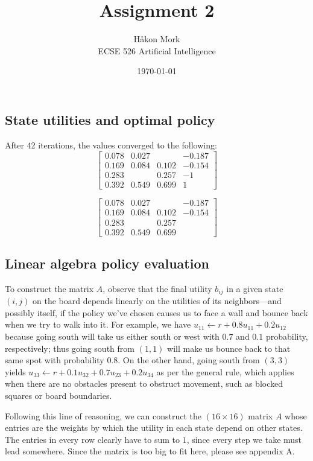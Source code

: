 \documentclass[letterpaper, 10pt]{article}
\title{\textbf{Assignment 2}}
\author{Håkon Mork \\ ECSE 526 Artificial Intelligence}
\date{\today}
\begin{document}
\maketitle
\noindent
\begin{multicols}{2}

\section{}
\subsection{State utilities and optimal policy}
After 42 iterations, the values converged to the following:
\[
	\begin{bmatrix}
		0.078 & 0.027 &       & -0.187 \\
		0.169 & 0.084 & 0.102 & -0.154 \\
		0.283 &       & 0.257 & -1 \\
		0.392 & 0.549 & 0.699 & 1
	\end{bmatrix}
\]

\[
	\begin{bmatrix}
		0.078 & 0.027 &       & -0.187 \\
		0.169 & 0.084 & 0.102 & -0.154 \\
		0.283 &       & 0.257 &  \\
		0.392 & 0.549 & 0.699 & 
	\end{bmatrix}
\]


\subsection{Linear algebra policy evaluation}
To construct the matrix $A$, observe that the final utility $b_{ij}$ in a given state $(i, j)$ on the board depends linearly on the utilities of its neighbors---and possibly itself, if the policy we've chosen causes us to face a wall and bounce back when we try to walk into it. For example, we have $u_{11} \gets r + 0.8 u_{11} + 0.2 u_{12}$ because going south will take us either south or west with $0.7$ and $0.1$ probability, respectively; thus going south from $(1,1)$ will make us bounce back to that same spot with probability $0.8$. On the other hand, going south from $(3,3)$ yields $u_{33} \gets r + 0.1 u_{32} + 0.7 u_{23} + 0.2 u_{34}$ as per the general rule, which applies when there are no obstacles present to obstruct movement, such as blocked squares or board boundaries. 

Following this line of reasoning, we can construct the $(16 \times 16)$ matrix $A$ whose entries are the weights by which the utility in each state depend on other states. The entries in every row clearly have to sum to $1$, since every step we take must lead somewhere. Since the matrix is too big to fit here, please see appendix A.


\end{multicols}
\end{document}
